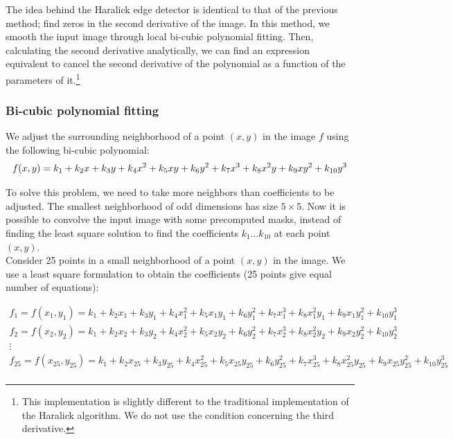 \documentclass{ipol}
\numberwithin{equation}{section}
\numberwithin{table}{section}
\numberwithin{figure}{section}
\begin{document}
The idea behind the Haralick edge detector is identical to that of the previous method; find zeros in 
the second derivative of the image. In this method, we smooth the input image through local bi-cubic
polynomial fitting. Then, calculating the second derivative analytically, we can find an expression 
equivalent to cancel the second derivative of the polynomial as a function of the parameters of it.\footnote{This implementation is slightly 
different to the traditional implementation of the Haralick algorithm. We do not use the condition concerning the third derivative.}\\

\subsubsection{Bi-cubic polynomial fitting}
\label{sec:bicubic}

We adjust the surrounding neighborhood of a point $(x,y)$ in the image $f$ using the following bi-cubic polynomial:
\begin{equation}
	\label{eq:bicubic}
	f(x,y) = k_1 + k_2x + k_3y + k_4x^2 + k_5xy + k_6y^2 + k_7x^3 + k_8x^2y + k_9xy^2 + k_{10}y^3\\
\end{equation}

To solve this problem, we need to take more neighbors than coefficients to be adjusted. The smallest 
neighborhood of odd dimensions has size $5\times5$. Now it is possible to convolve the input image
with some precomputed masks, instead of finding the least square solution to find the coefficients 
$k_1\dots k_{10}$ at each point $(x,y)$.\\

Consider 25 points in a small neighborhood of a point $(x,y)$ in the image. We use a least square
formulation to obtain the coefficients (25 points give equal number of equations):

\begin{equation*}
	\begin{array}{l}
		f_1 = f(x_1,y_1) = k_1 + k_2x_1 + k_3y_1 + k_4x_1^2 + k_5x_1y_1 + k_6y_1^2 + k_7x_1^3 + k_8x_1^2y_1 + k_9x_1y_1^2 + k_{10}y_1^3\\
		f_2 = f(x_2,y_2) = k_1 + k_2x_2 + k_3y_2 + k_4x_2^2 + k_5x_2y_2 + k_6y_2^2 + k_7x_2^3 + k_8x_2^2y_2 + k_9x_2y_2^2 + k_{10}y_2^3\\
		\vdots \\
		f_{25} = f(x_{25},y_{25}) = k_1 + k_2x_{25} + k_3y_{25} + k_4x_{25}^2 + k_5x_{25}y_{25} + k_6y_{25}^2 + k_7x_{25}^3 + k_8x_{25}^2y_{25} + k_9x_{25}y_{25}^2 + k_{10}y_{25}^3\\
	\end{array}
\end{equation*}
\end{document}
